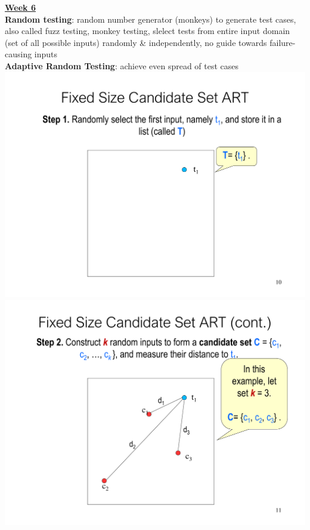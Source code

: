 \documentclass[a4paper]{article}
\begin{document}
\begin{multicols}{3}
        \underline{\textbf{Week 6}}\\
        \textbf{Random testing}: random number generator (monkeys) to generate test cases, also called fuzz testing, monkey testing, slelect tests from entire input domain (set of all possible inputs) randomly \& independently, no guide towards failure-causing inputs\\
        \textbf{Adaptive Random Testing}: achieve even spread of test cases\\
        \includegraphics[width=\linewidth]{259.pdf}\\
        \includegraphics[width=\linewidth]{260.pdf}\\

\end{multicols}
\end{document}
